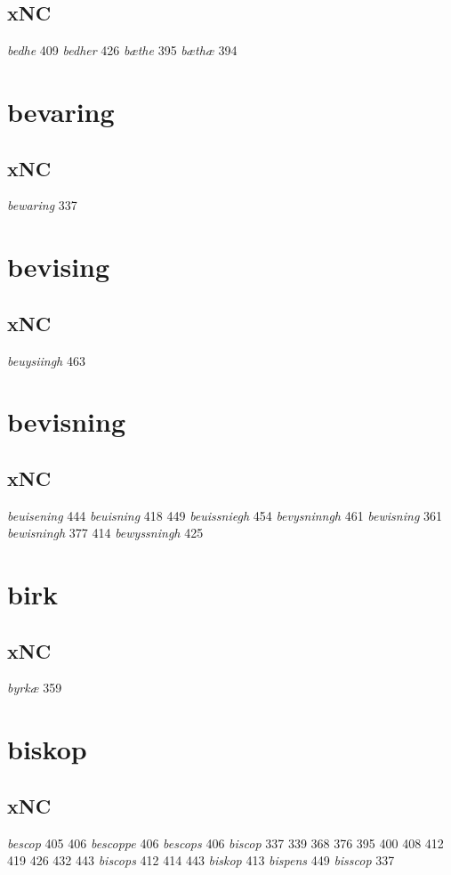 \documentclass[a4paper,twocolumn]{article}
\begin{document}
\subsection{xNC}
\label{sec:org6da2795}
\emph{bedhe} 409 \emph{bedher} 426 \emph{bæthe} 395 \emph{bæthæ} 394 
\section{bevaring}
\label{sec:orgb7e4783}
\subsection{xNC}
\label{sec:orgd1cc974}
\emph{bewaring} 337 
\section{bevising}
\label{sec:org45200f8}
\subsection{xNC}
\label{sec:org7e4163f}
\emph{beuysiingh} 463 
\section{bevisning}
\label{sec:org9e1554c}
\subsection{xNC}
\label{sec:orgbc041f7}
\emph{beuisening} 444 \emph{beuisning} 418 449 \emph{beuissniegh} 454 \emph{bevysninngh} 461 \emph{bewisning} 361 \emph{bewisningh} 377 414 \emph{bewyssningh} 425 
\section{birk}
\label{sec:org061c984}
\subsection{xNC}
\label{sec:org4eb2100}
\emph{byrkæ} 359 
\section{biskop}
\label{sec:org7873f99}
\subsection{xNC}
\label{sec:org9d32c03}
\emph{bescop} 405 406 \emph{bescoppe} 406 \emph{bescops} 406 \emph{biscop} 337 339 368 376 395 400 408 412 419 426 432 443 \emph{biscops} 412 414 443 \emph{biskop} 413 \emph{bispens} 449 \emph{bisscop} 337 
\end{document}
